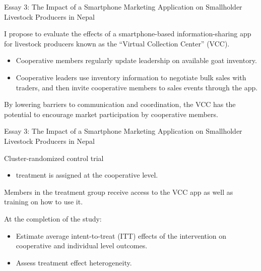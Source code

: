 \documentclass[aspectratio=169]{beamer}
\newenvironment{wideitemize}{\itemize\addtolength{\itemsep}{10pt}}{\enditemize}
\begin{document}
\begin{frame}{Essay 3: The Impact of a Smartphone Marketing Application on Smallholder Livestock Producers in Nepal}

    \begin{wideitemize}
        \item I propose to evaluate the effects of a smartphone-based information-sharing app for livestock producers known as the “Virtual Collection Center” (VCC). \vspace{.25cm}
        \begin{itemize}
            \item Cooperative members regularly update leadership on available goat inventory. \vspace{.25cm}
            \item Cooperative leaders use inventory information to negotiate bulk sales with traders, and then invite cooperative members to sales events through the app.
        \end{itemize}
        \item By lowering barriers to communication and coordination, the VCC has the potential to encourage market participation by cooperative members. 
    \end{wideitemize}
\end{frame}

\begin{frame}{Essay 3: The Impact of a Smartphone Marketing Application on Smallholder Livestock Producers in Nepal}

    \begin{wideitemize}
        \item Cluster-randomized control trial \vspace{.25cm}
        \begin{itemize}
            \item treatment is assigned at the cooperative level.
        \end{itemize}
        \item Members in the treatment group receive access to the VCC app as well as training on how to use it.
        \item At the completion of the study:
        \begin{itemize}
            \item Estimate average intent-to-treat (ITT) effects of the intervention on cooperative and individual level outcomes.
            \item Assess treatment effect heterogeneity.
        \end{itemize}
    \end{wideitemize}
\end{frame}
\end{document}
